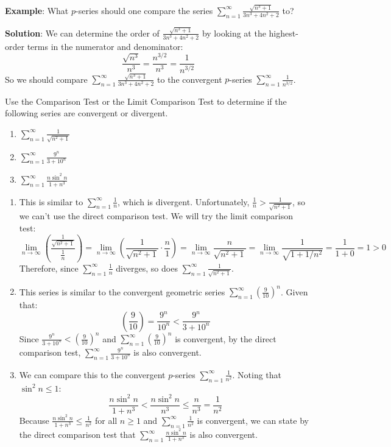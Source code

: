 \textbf{Example}: What $p$-series should one compare the series $\sum_{n=1}^
\infty \frac{\sqrt{n^3 + 1}}{3n^3 + 4n^2 + 2}$ to?

\textbf{Solution}: We can determine the order of $\frac{\sqrt{n^3 + 1}}{3n^3 
+ 4n^2 + 2}$ by looking at the highest-order terms in the numerator and 
denominator:
$$\frac{\sqrt{n^3}}{n^3} = \frac{n^{3/2}}{n^3} = \frac{1}{n^{3/2}}$$
So we should compare $\sum_{n=1}^\infty \frac{\sqrt{n^3 + 1}}{3n^3 + 4n^2 + 2}$ 
to the convergent $p$-series $\sum_{n=1}^\infty \frac{1}{n^{3/2}}$.

\begin{Exercise}[label = comp1]
Use the Comparison Test or the Limit Comparison Test to determine if the 
following series are convergent or divergent. 
\begin{enumerate}
\item $\sum_{n=1}^\infty \frac{1}{\sqrt{n^2 + 1}}$
\item $\sum_{n=1}^\infty \frac{9^n}{3 + 10^n}$
\item $\sum_{n=1}^\infty \frac{n \sin^2{n}}{1 + n^3}$
\end{enumerate}
\end{Exercise}

\begin{Answer}[ref = comp1]
\begin{enumerate}
\item This is similar to $\sum_{n=1}^\infty \frac{1}{n}$, which is divergent. 
Unfortunately, $\frac{1}{n} > \frac{1}{\sqrt{n^2 + 1}}$, so we can't use the 
direct comparison test. We will try the limit comparison test:
$$\lim_{n \to \infty} \left( \frac{\frac{1}{\sqrt{n^2 + 1}}}{\frac{1}{n}} 
\right) = \lim_{n \to \infty} \left( \frac{1}{\sqrt{n^2 + 1}} \cdot \frac{n}{1} 
\right) = \lim_{n \to \infty} \frac{n}{\sqrt{n^2 + 1}} = \lim_{n \to \infty} 
\frac{1}{\sqrt{1 + 1/n^2}} = \frac{1}{1+ 0} = 1 > 0$$
Therefore, since $\sum_{n=1}^\infty \frac{1}{n}$ diverges, so does $\sum_
{n=1}^\infty \frac{1}{\sqrt{n^2 + 1}}$.
\item This series is similar to the convergent geometric series $\sum_{n=1}^
\infty \left( \frac{9}{10} \right)^n$. Given that:
$$\left( \frac{9}{10} \right) = \frac{9^n}{10^n} < \frac{9^n}{3 + 10^n}$$
Since $\frac{9^n}{3 + 10^n} < \left( \frac{9}{10} \right)^n$ and $\sum_{n=1}
^\infty \left( \frac{9}{10} \right)^n$ is convergent, by the direct comparison 
test, $\sum_{n=1}^\infty \frac{9^n}{3 + 10^n}$ is also convergent. 
\item We can compare this to the convergent $p$-series $\sum_{n=1}^\infty 
\frac{1}{n^2}$. Noting that $\sin^2{n} \leq 1$:
$$\frac{n \sin^2{n}}{1 + n^3} < \frac{n \sin^2{n}}{n^3} \leq \frac{n}{n^3} = 
\frac{1}{n^2}$$
Because $\frac{n \sin^2{n}}{1 + n^3} \leq \frac{1}{n^2}$ for all $n \geq 1$ 
and $\sum_{n=1}^\infty \frac{1}{n^2}$ is convergent, we can state by the 
direct comparison test that $\sum_{n=1}^\infty \frac{n \sin^2{n}}{1 + n^3}$ 
is also convergent. 
\end{enumerate}
\end{Answer}

